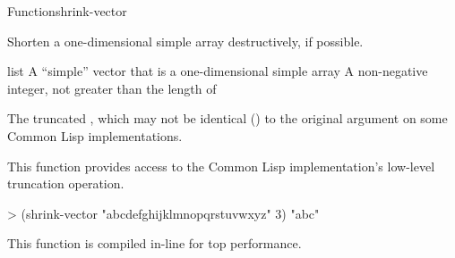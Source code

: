 \documentclass[10pt,twoside,english,pdftex]{article}
\newcommand{\inline}{This function is compiled in-line for top performance.}
\begin{document}

\begin{functiondoc}{Function}{shrink-vector}{
    \returns{} } 
  
\fnsyntax

\fnpurpose Shorten a one-dimensional simple array destructively, if 
possible.

\fnpackage {}

\fnmodule {}

\fnargs
\begin{args}{list}
\arg[vector] A ``simple'' vector that is a one-dimensional simple array
\arg[length] A non-negative integer, not greater than the length of
\end{args}

\fnreturns The truncated , which may not be identical ()
to the original  argument on some Common Lisp implementations.

\fndescription This function provides access to the Common Lisp
implementation's low-level truncation operation.

\fnexample
\begin{example}
> (shrink-vector "abcdefghijklmnopqrstuvwxyz" 3)
"abc"
\end{example}

\fnnote \inline

\end{functiondoc}

\end{document}
